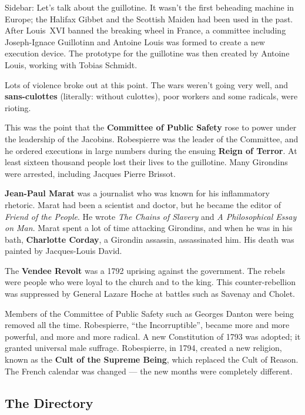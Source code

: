 Sidebar: Let's talk about the guillotine.
It wasn't the first beheading machine in Europe;
the Halifax Gibbet and the Scottish Maiden had been used in the past.
After Louis~XVI banned the breaking wheel in France,
a committee including Joseph-Ignace Guillotinn and Antoine Louis was formed to create a new execution device.
The prototype for the guillotine was then created by Antoine Louis, working with Tobias Schmidt.

Lots of violence broke out at this point.
The wars weren't going very well, and \textbf{sans-culottes} (literally: without culottes),
poor workers and some radicals, were rioting.

This was the point that the \textbf{Committee of Public Safety} rose to power under the leadership of the Jacobins.
Robespierre was the leader of the Committee,
and he ordered executions in large numbers during the ensuing \textbf{Reign of Terror}.
At least sixteen thousand people lost their lives to the guillotine.
Many Girondins were arrested, including Jacques Pierre Brissot.

\textbf{Jean-Paul Marat} was a journalist who was known for his inflammatory rhetoric.
Marat had been a scientist and doctor, but he became the editor of \textit{Friend of the People}.
He wrote \textit{The Chains of Slavery} and \textit{A Philosophical Essay on Man}.
Marat spent a lot of time attacking Girondins, and when he was in his bath,
\textbf{Charlotte Corday}, a Girondin assassin, assassinated him.
His death was painted by Jacques-Louis David.

The \textbf{Vendee Revolt} was a 1792 uprising against the government.
The rebels were people who were loyal to the church and to the king.
This counter-rebellion was suppressed by General Lazare Hoche at battles such as Savenay and Cholet.

Members of the Committee of Public Safety such as Georges Danton were being removed all the time.
Robespierre, ``the Incorruptible'', became more and more powerful, and more and more radical.
A new Constitution of 1793 was adopted; it granted universal male suffrage.
Robespierre, in 1794, created a new religion, known as the \textbf{Cult of the Supreme Being},
which replaced the Cult of Reason.
The French calendar was changed --- the new months were completely different.

\subsection*{The Directory}

